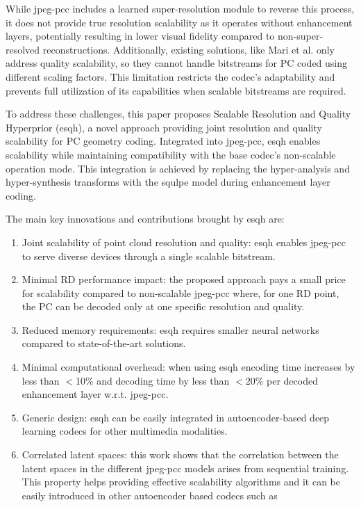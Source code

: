 While \gls{jpeg-pcc} includes a learned super-resolution module to reverse this process, it does not provide true resolution scalability as it operates without enhancement layers, potentially resulting in lower visual fidelity compared to non-super-resolved reconstructions.
Additionally, existing solutions, like Mari et al. \cite{mari2024point} only address quality scalability, so they cannot handle bitstreams for PC coded using different scaling factors. This limitation restricts the codec's adaptability and prevents full utilization of its capabilities when scalable bitstreams are required. 

To address these challenges, this paper proposes Scalable Resolution and Quality Hyperprior (\gls{esqh}), a novel approach providing joint resolution and quality scalability for PC geometry coding.  Integrated into  
\gls{jpeg-pcc}, \gls{esqh} enables scalability while maintaining compatibility with the base codec's non-scalable operation mode. This integration is achieved by replacing the hyper-analysis and hyper-synthesis transforms with the \gls{squlpe} model during enhancement layer coding.

The main key innovations and contributions brought by \gls{esqh} are:
\begin{enumerate}
    \item Joint scalability of point cloud resolution and quality: \gls{esqh} enables \gls{jpeg-pcc} to serve diverse devices through a single scalable bitstream. 
    \item Minimal RD performance impact: the proposed approach pays a small price for scalability compared to non-scalable \gls{jpeg-pcc} where, for one RD point, the PC can be decoded only at one specific resolution and quality.
    \item Reduced memory requirements: \gls{esqh} requires smaller neural networks compared to state-of-the-art solutions.
    \item Minimal computational overhead: when using \gls{esqh} encoding time increases by less than $<$10\% and decoding time by less than $<$20\% per decoded enhancement layer w.r.t. \gls{jpeg-pcc}.
    \item Generic design: \gls{esqh} can be easily integrated in autoencoder-based deep learning codecs for other multimedia modalities.
    \item Correlated latent spaces: this work shows that the correlation between the latent spaces in the different \gls{jpeg-pcc} models arises from sequential training. This property helps providing effective scalability algorithms and it can be easily introduced in other autoencoder based codecs such as \cite{balle2018variational, minnen2018joint, quach2020improved}
\end{enumerate}

